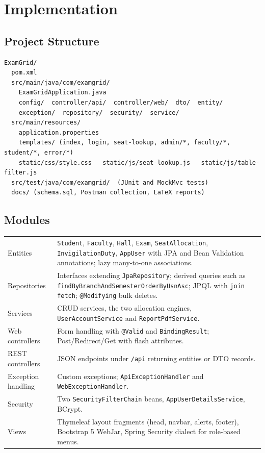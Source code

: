 \documentclass[12pt,a4paper,oneside]{report}
\begin{document}
\chapter{Implementation}
\section{Project Structure}
\begin{lstlisting}[style=plain]
ExamGrid/
  pom.xml
  src/main/java/com/examgrid/
    ExamGridApplication.java
    config/  controller/api/  controller/web/  dto/  entity/
    exception/  repository/  security/  service/
  src/main/resources/
    application.properties
    templates/ (index, login, seat-lookup, admin/*, faculty/*, student/*, error/*)
    static/css/style.css   static/js/seat-lookup.js   static/js/table-filter.js
  src/test/java/com/examgrid/  (JUnit and MockMvc tests)
  docs/ (schema.sql, Postman collection, LaTeX reports)
\end{lstlisting}

\section{Modules}
\begin{tabularx}{\linewidth}{|L{3.4cm}|X|}
\hline\headrow{} & \\\hline
Entities & \texttt{Student}, \texttt{Faculty}, \texttt{Hall}, \texttt{Exam}, \texttt{SeatAllocation}, \texttt{InvigilationDuty}, \texttt{AppUser} with JPA and Bean Validation annotations; lazy many-to-one associations.\\\hline
Repositories & Interfaces extending \texttt{JpaRepository}; derived queries such as \texttt{findByBranchAndSemesterOrderByUsnAsc}; JPQL with \texttt{join fetch}; \texttt{@Modifying} bulk deletes.\\\hline
Services & CRUD services, the two allocation engines, \texttt{UserAccountService} and \texttt{ReportPdfService}.\\\hline
Web controllers & Form handling with \texttt{@Valid} and \texttt{BindingResult}; Post/Redirect/Get with flash attributes.\\\hline
REST controllers & JSON endpoints under \texttt{/api} returning entities or DTO records.\\\hline
Exception handling & Custom exceptions; \texttt{ApiExceptionHandler} and \texttt{WebExceptionHandler}.\\\hline
Security & Two \texttt{SecurityFilterChain} beans, \texttt{AppUserDetailsService}, BCrypt.\\\hline
Views & Thymeleaf layout fragments (head, navbar, alerts, footer), Bootstrap 5 WebJar, Spring Security dialect for role-based menus.\\\hline
\end{tabularx}
\end{document}
